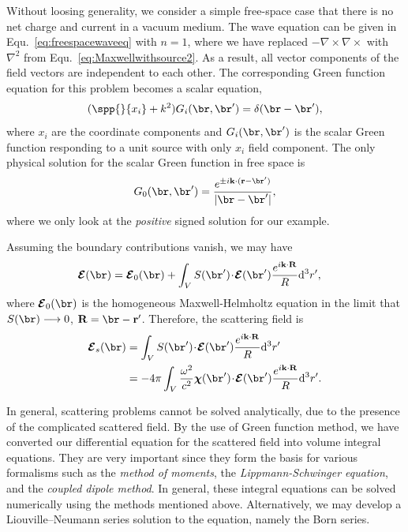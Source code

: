 \documentclass[]{report}
\begin{document}
Without loosing generality, we consider a simple free-space case that there is no net charge and current in a vacuum medium. The wave equation can be given in Equ.~\eqref{eq:freespacewaveeq} with $ n=1 $, where we have replaced $ -\nabla\times\nabla\times $ with $ \nabla^2 $ from Equ.~\eqref{eq:Maxwellwithsource2}. As a result, all vector components of the field vectors are independent to each other. The corresponding Green function equation for this problem becomes a scalar equation,
\begin{align}
(\spp{}{x_i} + k^2) G_i(\br,\br')=\delta(\br-\br'), 
\end{align}
where $ x_i $ are the coordinate components and $ G_i(\br,\br') $ is the scalar Green function responding to a unit source with only $ x_i $ field component. 
The only physical solution for the scalar Green function in free space is 
\begin{align}
G_0(\br,\br') =\frac{e^{\pm i\mathbf{k}\cdot (\mathbf{r}-\br')}}{|\br-\br'|},
\end{align}
where we only look at the \textit{positive} signed solution for our example. 

Assuming the boundary contributions vanish, we may have
\begin{align}
\boldsymbol{\mathcal{E}}(\br) &= \boldsymbol{\mathcal{E}}_0 (\br) + \int_V S(\br') \! \cdot\! \boldsymbol{\mathcal{E}}(\br') \frac{e^{i\mathbf{k}\cdot \mathbf{R}}}{R} \mathrm{d}^3 r', \label{Etotal0}
\end{align}
where $ \boldsymbol{\mathcal{E}}_0 (\br) $ is the homogeneous Maxwell-Helmholtz equation in the limit that $ S(\br)\longrightarrow 0 $, $ \mathbf{R}=\br-\mathbf{r}' $. Therefore, the scattering field is
\begin{align}
\boldsymbol{\mathcal{E}}_s(\br) &=  \int_V S(\br') \! \cdot\!\boldsymbol{\mathcal{E}}(\br') \frac{e^{i\mathbf{k}\cdot \mathbf{R}}}{R} \mathrm{d}^3 r'\\
&= -4\pi \int_V \frac{\omega^2}{c^2} \boldsymbol{\chi}(\br') \! \cdot\!\boldsymbol{\mathcal{E}}(\br') \frac{e^{i\mathbf{k}\cdot \mathbf{R}}}{R} \mathrm{d}^3 r'.
\end{align}



In general, scattering problems cannot be solved analytically, due to the presence of the complicated scattered field. By the use of Green function method, we have converted our differential equation for the scattered field into volume integral equations. They are very important since they form the basis for various formalisms such as the \textit{method of moments}, the \textit{Lippmann-Schwinger equation}, and the \textit{coupled dipole method}. In general, these integral equations can be solved numerically using the methods mentioned above. Alternatively, we may develop a Liouville–Neumann series solution to the equation, namely the Born series.
\end{document}
